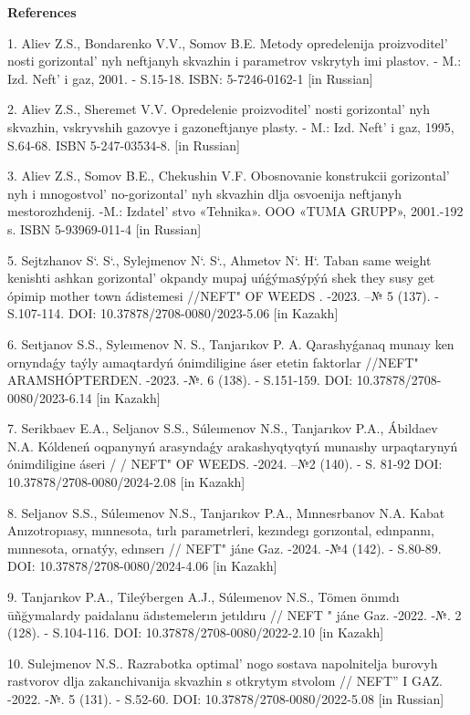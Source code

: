 \begin{center}
{\bfseries References}
\end{center}

\begin{references}

1. Aliev Z.S., Bondarenko V.V., Somov B.E. Metody opredelenija
proizvoditel' nosti gorizontal' nyh
neftjanyh skvazhin i parametrov vskrytyh imi plastov. - M.: Izd.
Neft'{} i gaz, 2001. - S.15-18. ISBN: 5-7246-0162-1 {[}in
Russian{]}

2. Aliev Z.S., Sheremet V.V. Opredelenie
proizvoditel' nosti gorizontal' nyh
skvazhin, vskryvshih gazovye i gazoneftjanye plasty. - M.: Izd.
Neft'{} i gaz, 1995, S.64-68. ISBN 5-247-03534-8. {[}in
Russian{]}

3. Aliev Z.S., Somov B.E., Chekushin V.F. Obosnovanie konstrukcii
gorizontal' nyh i
mnogostvol' no-gorizontal' nyh skvazhin
dlja osvoenija neftjanyh mestorozhdenij. -M.:
Izdatel' stvo «Tehnika». OOO «TUMA GRUPP», 2001.-192 s.
ISBN 5-93969-011-4 {[}in Russian{]}

5. Sejtzhanov S`. S`., Sylejmenov N`. S`., Ahmetov N`. H`. Taban same
weight kenishti ashkan gorizontal'{} okpandy mupaј
uńǵýmaѕýpýń shek they susy get ópimip mother town ádistemesi //NEFT" OF
WEEDS . -2023. --№ 5 (137). - S.107-114. DOI:
10.37878/2708-0080/2023-5.06 {[}in Kazakh{]}

6. Seıtjanov S.S., Syleımenov N. S., Tanjarıkov P. A. Qarashyǵanaq
munaıy ken ornyndaǵy taýly aımaqtardyń ónimdiligine áser etetin
faktorlar //NEFT" ARAMSHÓPTERDEN. -2023. -№. 6 (138). - S.151-159. DOI:
10.37878/2708-0080/2023-6.14 {[}in Kazakh{]}

7. Serikbaev E.A., Seljanov S.S., Súleımenov N.S., Tanjarıkov P.A.,
Ábildaev N.A. Kóldeneń oqpanynyń arasyndaǵy arakashyqtyqtyń munaıshy
urpaqtarynyń ónimdiligine áseri / / NEFT" OF WEEDS. -2024. --№2 (140). -
S. 81-92 DOI: 10.37878/2708-0080/2024-2.08 {[}in Kazakh{]}

8. Seljanov S.S., Súleımenov N.S., Tanjarıkov P.A., Mınnesrbanov N.A.
Kabat Anızotropıasy, mınnesota, tırlı parametrleri, kezındegı
gorızontal, edınpannı, mınnesota, ornatýy, edınserı // NEFT" jáne Gaz.
-2024. -№4 (142). - S.80-89. DOI: 10.37878/2708-0080/2024-4.06 {[}in
Kazakh{]}

9. Tanjarıkov P.A., Tileýbergen A.J., Súleımenov N.S., Tömen önımdı
ūñğymalardy paidalanu ädıstemelerın jetıldıru // NEFT " jáne Gaz. -2022.
-№. 2 (128). - S.104-116. DOI: 10.37878/2708-0080/2022-2.10 {[}in
Kazakh{]}

10. Sulejmenov N.S.. Razrabotka optimal' nogo sostava
napolnitelja burovyh rastvorov dlja zakanchivanija skvazhin s otkrytym
stvolom // NEFT''{} I GAZ. -2022. -№. 5
(131). - S.52-60. DOI: 10.37878/2708-0080/2022-5.08 {[}in Russian{]}
\end{references}

